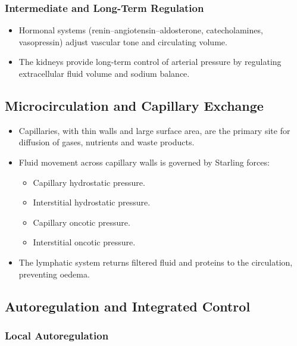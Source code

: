 \documentclass[11pt,a4paper]{article}
\begin{document}
\subsubsection{Intermediate and Long-Term Regulation}

\begin{itemize}
  \item Hormonal systems (renin--angiotensin--aldosterone, catecholamines, vasopressin) adjust vascular tone and circulating volume.
  \item The kidneys provide long-term control of arterial pressure by regulating extracellular fluid volume and sodium balance.
\end{itemize}

\subsection{Microcirculation and Capillary Exchange}

\begin{itemize}
  \item Capillaries, with thin walls and large surface area, are the primary site for diffusion of gases, nutrients and waste products.
  \item Fluid movement across capillary walls is governed by Starling forces:
    \begin{itemize}
      \item Capillary hydrostatic pressure.
      \item Interstitial hydrostatic pressure.
      \item Capillary oncotic pressure.
      \item Interstitial oncotic pressure.
    \end{itemize}
  \item The lymphatic system returns filtered fluid and proteins to the circulation, preventing oedema.
\end{itemize}

\subsection{Autoregulation and Integrated Control}

\subsubsection{Local Autoregulation}
\end{document}
